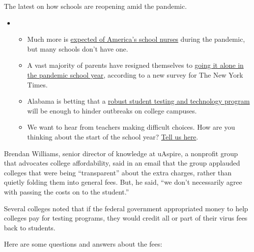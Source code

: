 The latest on how schools are reopening amid the pandemic.

\begin{itemize}
\item
  \begin{itemize}
  \tightlist
  \item
    Much more is
    \href{https://www.nytimes3xbfgragh.onion/2020/08/20/us/schools-reopening-nurses-covid.html?action=click\&pgtype=Article\&state=default\&region=MAIN_CONTENT_3\&context=storylines_keepup}{expected
    of America's school nurses} during the pandemic, but many schools
    don't have one.
  \item
    A vast majority of parents have resigned themselves to
    \href{https://www.nytimes3xbfgragh.onion/2020/08/19/us/colleges-closing-covid.html?action=click\&pgtype=Article\&state=default\&region=MAIN_CONTENT_3\&context=storylines_keepup}{going
    it alone in the pandemic school year}, according to a new survey for
    The New York Times.
  \item
    Alabama is betting that a
    \href{https://www.nytimes3xbfgragh.onion/2020/08/19/business/alabama-uab-coronavirus-tests.html?action=click\&pgtype=Article\&state=default\&region=MAIN_CONTENT_3\&context=storylines_keepup}{robust
    student testing and technology program} will be enough to hinder
    outbreaks on college campuses.
  \item
    We want to hear from teachers making difficult choices. How are you
    thinking about the start of the school year?
    \href{https://www.nytimes3xbfgragh.onion/2020/08/19/us/teachers-school-reopenings.html?action=click\&pgtype=Article\&state=default\&region=MAIN_CONTENT_3\&context=storylines_keepup}{Tell
    us here}.
  \end{itemize}
\end{itemize}

Brendan Williams, senior director of knowledge at uAspire, a nonprofit
group that advocates college affordability, said in an email that the
group applauded colleges that were being ``transparent'' about the extra
charges, rather than quietly folding them into general fees. But, he
said, ``we don't necessarily agree with passing the costs on to the
student.''

Several colleges noted that if the federal government appropriated money
to help colleges pay for testing programs, they would credit all or part
of their virus fees back to students.

Here are some questions and answers about the fees:

